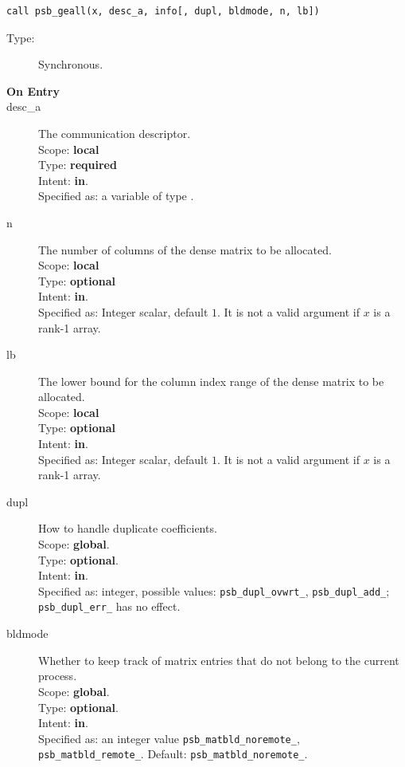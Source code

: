 \begin{verbatim}
call psb_geall(x, desc_a, info[, dupl, bldmode, n, lb])
\end{verbatim}

\begin{description}
\item[Type:] Synchronous.
\item[\bf On Entry]
\item[desc\_a] The communication descriptor.\\
Scope: {\bf local} \\
Type: {\bf required}\\
Intent: {\bf in}.\\
Specified as: a variable of type \descdata.\\
\item[n] The number of columns of the dense matrix to be allocated.\\
Scope: {\bf local} \\
Type: {\bf optional}\\
Intent: {\bf in}.\\
Specified as: Integer scalar, default $1$. It is not a valid argument  if $x$ is a
rank-1 array. 
\item[lb] The lower bound for the column index range of the dense matrix to be allocated.\\
Scope: {\bf local} \\
Type: {\bf optional}\\
Intent: {\bf in}.\\
Specified as: Integer scalar, default $1$. It is not a valid argument if $x$ is a
rank-1 array. 
\item[dupl] How to handle duplicate coefficients.\\
Scope: {\bf global}.\\
Type: {\bf optional}.\\
Intent: {\bf in}.\\
Specified as: integer, possible values: \verb|psb_dupl_ovwrt_|,
\verb|psb_dupl_add_|; \verb|psb_dupl_err_| has no effect.
\item[bldmode] Whether to keep track of matrix entries that do not
  belong to the current process.\\ 
Scope: {\bf global}.\\
Type: {\bf optional}.\\
Intent: {\bf in}.\\
Specified as: an integer value \verb|psb_matbld_noremote_|,
\verb|psb_matbld_remote_|.  Default:  \verb|psb_matbld_noremote_|.
\end{description}

